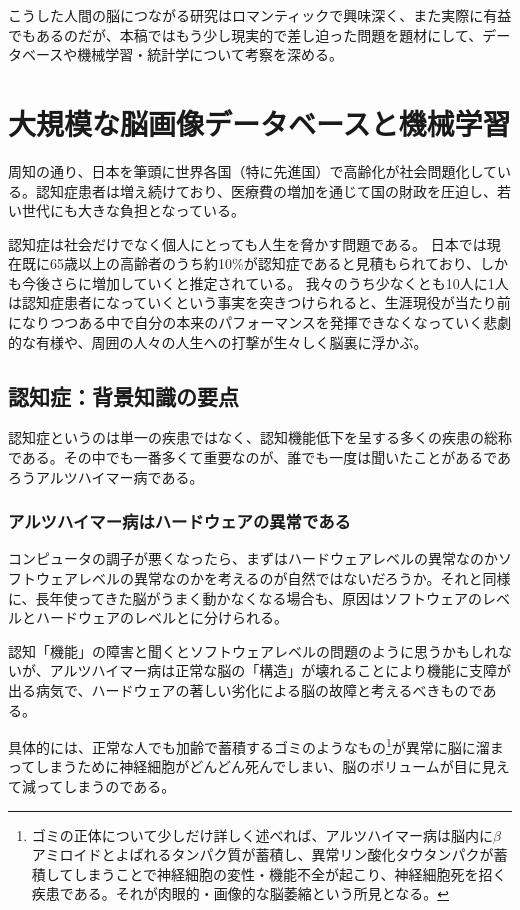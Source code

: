 こうした人間の脳につながる研究はロマンティックで興味深く、また実際に有益でもあるのだが、本稿ではもう少し現実的で差し迫った問題を題材にして、データベースや機械学習・統計学について考察を深める。

\section{大規模な脳画像データベースと機械学習}
周知の通り、日本を筆頭に世界各国（特に先進国）で高齢化が社会問題化している。認知症患者は増え続けており、医療費の増加を通じて国の財政を圧迫し、若い世代にも大きな負担となっている。

認知症は社会だけでなく個人にとっても人生を脅かす問題である。
日本では現在既に65歳以上の高齢者のうち約10\%が認知症であると見積もられており、しかも今後さらに増加していくと推定されている。
我々のうち少なくとも10人に1人は認知症患者になっていくという事実を突きつけられると、生涯現役が当たり前になりつつある中で自分の本来のパフォーマンスを発揮できなくなっていく悲劇的な有様や、周囲の人々の人生への打撃が生々しく脳裏に浮かぶ。

\subsection{認知症：背景知識の要点}
認知症というのは単一の疾患ではなく、認知機能低下を呈する多くの疾患の総称である。その中でも一番多くて重要なのが、誰でも一度は聞いたことがあるであろうアルツハイマー病である。

\subsubsection{アルツハイマー病はハードウェアの異常である}
コンピュータの調子が悪くなったら、まずはハードウェアレベルの異常なのかソフトウェアレベルの異常なのかを考えるのが自然ではないだろうか。それと同様に、長年使ってきた脳がうまく動かなくなる場合も、原因はソフトウェアのレベルとハードウェアのレベルとに分けられる。

認知「機能」の障害と聞くとソフトウェアレベルの問題のように思うかもしれないが、アルツハイマー病は正常な脳の「構造」が壊れることにより機能に支障が出る病気で、ハードウェアの著しい劣化による脳の故障と考えるべきものである。

具体的には、正常な人でも加齢で蓄積するゴミのようなもの\footnote{ゴミの正体について少しだけ詳しく述べれば、アルツハイマー病は脳内に$\beta$アミロイドとよばれるタンパク質が蓄積し、異常リン酸化タウタンパクが蓄積してしまうことで神経細胞の変性・機能不全が起こり、神経細胞死を招く疾患である。それが肉眼的・画像的な脳萎縮という所見となる。}が異常に脳に溜まってしまうために神経細胞がどんどん死んでしまい、脳のボリュームが目に見えて減ってしまうのである。

